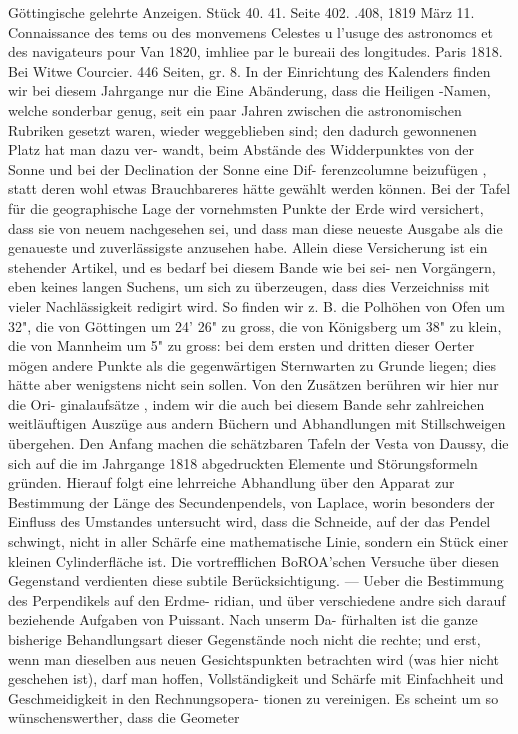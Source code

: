 \documentclass[12pt,a4paper]{article}
\begin{document}
{{{{{{{{Göttingische  gelehrte  Anzeigen.     Stück  40.  41.     Seite  402.  .408,     1819  März  11. Connaissance  des  tems  ou    des   monvemens   Celestes  u   l'usuge    des  astronomcs  et    des  navigateurs  pour Van  1820,  imhliee  par  le  bureaii  des  longitudes.     Paris  1818.     Bei  Witwe  Courcier.     446  Seiten,     gr.  8. In  der  Einrichtung  des  Kalenders  finden   wir  bei  diesem   Jahrgange  nur   die    Eine    Abänderung, dass  die  Heiligen -Namen,  welche  sonderbar  genug,    seit    ein  paar  Jahren   zwischen  die  astronomischen Rubriken  gesetzt  waren,  wieder  weggeblieben  sind;  den  dadurch  gewonnenen  Platz  hat   man  dazu  ver- wandt, beim  Abstände  des  Widderpunktes  von  der  Sonne  und  bei  der  Declination  der  Sonne   eine  Dif- ferenzcolumne  beizufügen ,  statt  deren  wohl  etwas  Brauchbareres  hätte  gewählt  werden  können.     Bei  der Tafel  für  die  geographische  Lage  der  vornehmsten  Punkte  der  Erde  wird  versichert,  dass  sie  von  neuem nachgesehen  sei,   und    dass   man   diese  neueste  Ausgabe   als  die  genaueste  und  zuverlässigste  anzusehen habe.    Allein  diese  Versicherung  ist  ein  stehender  Artikel,  und  es  bedarf  bei  diesem  Bande  wie  bei  sei- nen Vorgängern,  eben  keines  langen  Suchens,  um  sich  zu  überzeugen,  dass  dies  Verzeichniss  mit  vieler Nachlässigkeit  redigirt  wird.     So  finden  wir  z.  B.   die  Polhöhen   von    Ofen   um  32",    die   von    Göttingen um  24'  26"  zu  gross,  die  von  Königsberg  um  38"  zu  klein,  die  von  Mannheim  um  5"  zu  gross:  bei  dem ersten  und  dritten  dieser  Oerter  mögen  andere  Punkte    als   die  gegenwärtigen   Sternwarten   zu    Grunde liegen;  dies  hätte  aber  wenigstens  nicht  sein  sollen.     Von  den  Zusätzen  berühren  wir  hier  nur  die  Ori- ginalaufsätze ,  indem  wir  die  auch  bei  diesem  Bande  sehr  zahlreichen  weitläuftigen  Auszüge  aus  andern Büchern  und  Abhandlungen  mit  Stillschweigen  übergehen.     Den  Anfang  machen  die  schätzbaren  Tafeln der  Vesta  von  Daussy,  die  sich  auf  die  im  Jahrgange  1818  abgedruckten  Elemente  und  Störungsformeln gründen.     Hierauf  folgt  eine  lehrreiche  Abhandlung  über  den  Apparat   zur  Bestimmung  der  Länge  des Secundenpendels,  von  Laplace,  worin  besonders  der  Einfluss  des  Umstandes   untersucht  wird,    dass  die Schneide,  auf  der  das  Pendel  schwingt,    nicht  in  aller  Schärfe    eine   mathematische  Linie,    sondern  ein Stück  einer  kleinen  Cylinderfläche  ist.     Die  vortrefflichen  BoROA'schen  Versuche  über  diesen  Gegenstand verdienten  diese  subtile  Berücksichtigung.  ---     Ueber  die  Bestimmung  des  Perpendikels  auf  den  Erdme- ridian,  und  über  verschiedene  andre  sich  darauf  beziehende  Aufgaben  von  Puissant.     Nach  unserm  Da- fürhalten ist  die  ganze  bisherige  Behandlungsart   dieser   Gegenstände  noch  nicht  die  rechte;    und  erst, wenn  man  dieselben  aus  neuen  Gesichtspunkten   betrachten   wird   (was  hier  nicht  geschehen  ist),   darf man  hoffen,  Vollständigkeit  und  Schärfe  mit  Einfachheit  und  Geschmeidigkeit  in  den  Rechnungsopera- tionen zu  vereinigen.     Es  scheint  um  so  wünschenswerther,  dass  die  Geometer  }}}}}}}}
\end{document}
